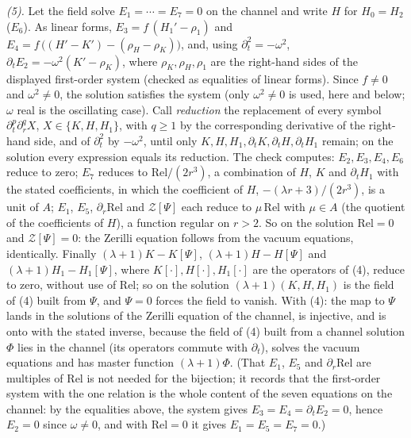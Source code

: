 \emph{(5).} Let the field solve $E_{1} = \cdots = E_{7} = 0$ on the channel and write $H$ for $H_{0} = H_{2}$ ($E_{6}$). As linear forms, $E_{3} = f\,(H_{1}' - \rho_{1})$ and $E_{4} = f\,\bigl((H' - K') - (\rho_{H} - \rho_{K})\bigr)$, and, using $\partial_{t}^{2} = -\omega^{2}$, $\partial_{t}E_{2} = -\omega^{2}(K' - \rho_{K})$, where $\rho_{K}, \rho_{H}, \rho_{1}$ are the right-hand sides of the displayed first-order system (checked as equalities of linear forms). Since $f \neq 0$ and $\omega^{2} \neq 0$, the solution satisfies the system (only $\omega^{2} \neq 0$ is used, here and below; $\omega$ real is the oscillating case). Call \emph{reduction} the replacement of every symbol $\partial_{t}^{p}\partial_{r}^{q}X$, $X \in \{K, H, H_{1}\}$, with $q \geq 1$ by the corresponding derivative of the right-hand side, and of $\partial_{t}^{2}$ by $-\omega^{2}$, until only $K, H, H_{1}, \partial_{t}K, \partial_{t}H, \partial_{t}H_{1}$ remain; on the solution every expression equals its reduction. The check computes: $E_{2}, E_{3}, E_{4}, E_{6}$ reduce to zero; $E_{7}$ reduces to $\mathrm{Rel}/(2r^{3})$, a combination of $H$, $K$ and $\partial_{t}H_{1}$ with the stated coefficients, in which the coefficient of $H$, $-(\lambda r + 3)/(2r^{3})$, is a unit of $A$; $E_{1}$, $E_{5}$, $\partial_{r}\mathrm{Rel}$ and $\mathcal{Z}[\Psi]$ each reduce to $\mu\,\mathrm{Rel}$ with $\mu \in A$ (the quotient of the coefficients of $H$), a function regular on $r > 2$. So on the solution $\mathrm{Rel} = 0$ and $\mathcal{Z}[\Psi] = 0$: the Zerilli equation follows from the vacuum equations, identically. Finally $(\lambda + 1)K - K[\Psi]$, $(\lambda + 1)H - H[\Psi]$ and $(\lambda + 1)H_{1} - H_{1}[\Psi]$, where $K[\cdot], H[\cdot], H_{1}[\cdot]$ are the operators of (4), reduce to zero, without use of $\mathrm{Rel}$; so on the solution $(\lambda + 1)(K, H, H_{1})$ is the field of (4) built from $\Psi$, and $\Psi = 0$ forces the field to vanish. With (4): the map to $\Psi$ lands in the solutions of the Zerilli equation of the channel, is injective, and is onto with the stated inverse, because the field of (4) built from a channel solution $\Phi$ lies in the channel (its operators commute with $\partial_{t}$), solves the vacuum equations and has master function $(\lambda + 1)\Phi$. (That $E_{1}$, $E_{5}$ and $\partial_{r}\mathrm{Rel}$ are multiples of $\mathrm{Rel}$ is not needed for the bijection; it records that the first-order system with the one relation is the whole content of the seven equations on the channel: by the equalities above, the system gives $E_{3} = E_{4} = \partial_{t}E_{2} = 0$, hence $E_{2} = 0$ since $\omega \neq 0$, and with $\mathrm{Rel} = 0$ it gives $E_{1} = E_{5} = E_{7} = 0$.)

